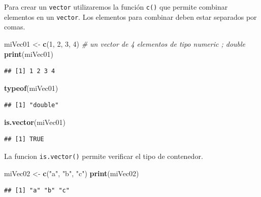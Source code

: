 \documentclass[
]{book}
\newenvironment{Shaded}{\begin{snugshade}}{\end{snugshade}}
\newcommand{\CommentTok}[1]{\textcolor[rgb]{0.56,0.35,0.01}{\textit{#1}}}
\newcommand{\DecValTok}[1]{\textcolor[rgb]{0.00,0.00,0.81}{#1}}
\newcommand{\KeywordTok}[1]{\textcolor[rgb]{0.13,0.29,0.53}{\textbf{#1}}}
\newcommand{\NormalTok}[1]{#1}
\newcommand{\StringTok}[1]{\textcolor[rgb]{0.31,0.60,0.02}{#1}}
\begin{document}
Para crear un \texttt{vector} utilizaremos la función \texttt{c()} que permite combinar elementos en un \texttt{vector}. Los elementos para combinar deben estar separados por comas.

\begin{Shaded}
\begin{Highlighting}[]
\NormalTok{miVec01 <-}\StringTok{ }\KeywordTok{c}\NormalTok{(}\DecValTok{1}\NormalTok{, }\DecValTok{2}\NormalTok{, }\DecValTok{3}\NormalTok{, }\DecValTok{4}\NormalTok{) }\CommentTok{# un vector de 4 elementos de tipo numeric ; double}
\KeywordTok{print}\NormalTok{(miVec01)}
\end{Highlighting}
\end{Shaded}

\begin{verbatim}
## [1] 1 2 3 4
\end{verbatim}

\begin{Shaded}
\begin{Highlighting}[]
\KeywordTok{typeof}\NormalTok{(miVec01)}
\end{Highlighting}
\end{Shaded}

\begin{verbatim}
## [1] "double"
\end{verbatim}

\begin{Shaded}
\begin{Highlighting}[]
\KeywordTok{is.vector}\NormalTok{(miVec01)}
\end{Highlighting}
\end{Shaded}

\begin{verbatim}
## [1] TRUE
\end{verbatim}

La funcion \texttt{is.vector()} permite verificar el tipo de contenedor.

\begin{Shaded}
\begin{Highlighting}[]
\NormalTok{miVec02 <-}\StringTok{ }\KeywordTok{c}\NormalTok{(}\StringTok{"a"}\NormalTok{, }\StringTok{"b"}\NormalTok{, }\StringTok{"c"}\NormalTok{) }
\KeywordTok{print}\NormalTok{(miVec02)}
\end{Highlighting}
\end{Shaded}

\begin{verbatim}
## [1] "a" "b" "c"
\end{verbatim}
\end{document}
